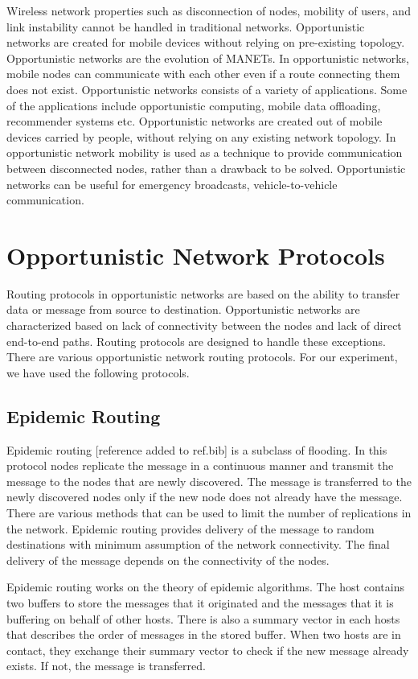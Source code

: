 \documentclass[conference]{IEEEtran}
\begin{document}
Wireless network properties such as disconnection of nodes, mobility of users, and link instability cannot be handled in traditional networks. Opportunistic networks are created for mobile devices without relying on pre-existing topology. Opportunistic networks are the evolution of MANETs. In opportunistic networks, mobile nodes can communicate with each other even if a route connecting them does not exist. Opportunistic networks consists of a variety of applications. Some of the applications include opportunistic computing, mobile data offloading, recommender systems etc. Opportunistic networks are created out of mobile devices carried by people, without relying on any existing network topology. In opportunistic network mobility is used as a technique to provide communication between disconnected nodes, rather than a drawback to be solved. Opportunistic networks can be useful for emergency broadcasts, vehicle-to-vehicle communication.



\section{Opportunistic Network Protocols}
Routing protocols in opportunistic networks are based on the ability to transfer data or message from source to destination. Opportunistic networks are characterized based on lack of connectivity between the nodes and lack of direct end-to-end paths. Routing protocols are designed to handle these exceptions. There are various opportunistic network routing protocols. For our experiment, we have used the following protocols.

\subsection{Epidemic Routing}  
Epidemic routing [reference added to ref.bib] is a subclass of flooding. In this protocol nodes replicate the message in a continuous manner and transmit the message to the nodes that are newly discovered. The message is transferred to the newly discovered nodes only if the new node does not already have the message. There are various methods that can be used to limit the number of replications in the network. Epidemic routing provides delivery of the message to random destinations with minimum assumption of the network connectivity. The final delivery of the message depends on the connectivity of the nodes. 

Epidemic routing works on the theory of epidemic algorithms. The host contains two buffers to store the messages that it originated and the messages that it is buffering on behalf of other hosts. There is also a summary vector in each hosts that describes the order of messages in the stored buffer. When two hosts are in contact, they exchange their summary vector to check if the new message already exists. If not, the message is transferred. 
\end{document}
